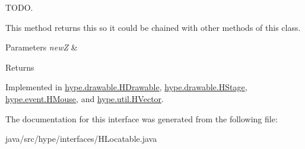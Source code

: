 T\-O\-D\-O. 

This method returns {\ttfamily this} so it could be chained with other methods of this class. 
\begin{DoxyParams}{Parameters}
{\em new\-Z} & \\
\hline
\end{DoxyParams}
\begin{DoxyReturn}{Returns}

\end{DoxyReturn}


Implemented in \hyperlink{classhype_1_1drawable_1_1_h_drawable_a3208358a57a297c1671901555e51bd59}{hype.\-drawable.\-H\-Drawable}, \hyperlink{classhype_1_1drawable_1_1_h_stage_a11bc569898118ace4345b069c3e32029}{hype.\-drawable.\-H\-Stage}, \hyperlink{classhype_1_1event_1_1_h_mouse_af9d6afdcbccdf0fcb958b02950acc37c}{hype.\-event.\-H\-Mouse}, and \hyperlink{classhype_1_1util_1_1_h_vector_a2f926d05dbfa381a3add77a6c93f6385}{hype.\-util.\-H\-Vector}.



The documentation for this interface was generated from the following file\-:\begin{DoxyCompactItemize}
\item 
java/src/hype/interfaces/H\-Locatable.\-java\end{DoxyCompactItemize}
